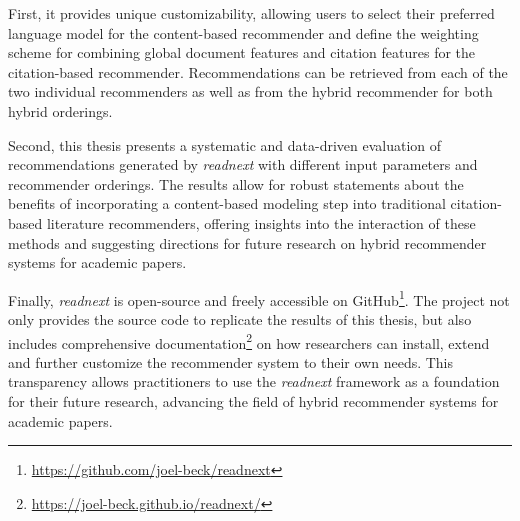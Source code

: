 First, it provides unique customizability, allowing users to select their preferred language model for the content-based recommender and define the weighting scheme for combining global document features and citation features for the citation-based recommender.
Recommendations can be retrieved from each of the two individual recommenders as well as from the hybrid recommender for both hybrid orderings.

Second, this thesis presents a systematic and data-driven evaluation of recommendations generated by \emph{readnext} with different input parameters and recommender orderings.
The results allow for robust statements about the benefits of incorporating a content-based modeling step into traditional citation-based literature recommenders, offering insights into the interaction of these methods and suggesting directions for future research on hybrid recommender systems for academic papers.

Finally, \emph{readnext} is open-source and freely accessible on GitHub\footnote{\url{https://github.com/joel-beck/readnext}}. The project not only provides the source code to replicate the results of this thesis, but also includes comprehensive documentation\footnote{\url{https://joel-beck.github.io/readnext/}} on how researchers can install, extend and further customize the recommender system to their own needs. This transparency allows practitioners to use the \emph{readnext} framework as a foundation for their future research, advancing the field of hybrid recommender systems for academic papers.
